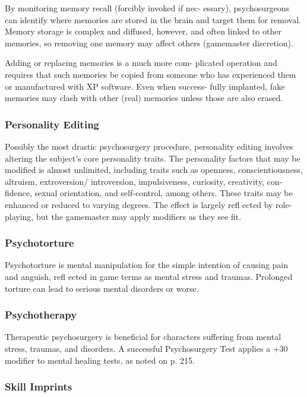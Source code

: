 By monitoring memory recall (forcibly invoked if nec-
essary), psychosurgeons can identify where memories 
are stored in the brain and target them for removal. 
Memory storage is complex and diffused, however, 
and often linked to other memories, so removing one 
memory may affect others (gamemaster discretion).

Adding or replacing memories is a much more com-
plicated operation and requires that such memories be 
copied from someone who has experienced them or 
manufactured with XP software. Even when success-
fully implanted, fake memories may clash with other 
(real) memories unless those are also erased.

\subsubsection{Personality Editing}

Possibly the most drastic psychosurgery procedure, 
personality editing involves altering the subject's core 
personality traits. The personality factors that may be 
modified is almost unlimited, including traits such as 
openness, conscientiousness, altruism, extroversion/
introversion, impulsiveness, curiosity, creativity, con-
fidence, sexual orientation, and self-control, among 
others. These traits may be enhanced or reduced to 
varying degrees. The effect is largely refl ected by role-
playing, but the gamemaster may apply modifiers as 
they see fit.

\subsubsection{Psychotorture}

Psychotorture is mental manipulation for the simple 
intention of causing pain and anguish, refl ected  in 
game terms as mental stress and traumas. Prolonged 
torture can lead to serious mental disorders or worse.

\subsubsection{Psychotherapy}

Therapeutic psychosurgery is beneficial for characters 
suffering from mental stress, traumas, and disorders. A 
successful Psychosurgery Test applies a +30 modifier 
to mental healing tests, as noted on p. 215.

\subsubsection{Skill Imprints}

